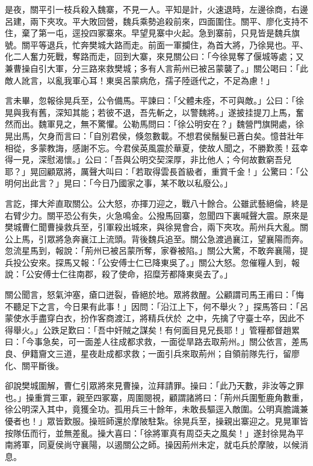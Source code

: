 是夜，關平引一枝兵殺入魏寨，不見一人。平知是計，火速退時，左邊徐商，右邊呂建，兩下夾攻。平大敗回營，魏兵乘勢追殺前來，四面圍住。關平、廖化支持不住，棄了第一屯，逕投四冢寨來。早望見寨中火起。急到寨前，只見皆是魏兵旗號。關平等退兵，忙奔樊城大路而走。前面一軍攔住，為首大將，乃徐晃也。平、化二人奮力死戰，奪路而走，回到大寨，來見關公曰：「今徐晃奪了偃城等處；又兼曹操自引大軍，分三路來救樊城；多有人言荊州已被呂蒙襲了。」關公喝曰：「此敵人訛言，以亂我軍心耳！東吳呂蒙病危，孺子陸遜代之，不足為慮！」

言未畢，忽報徐晃兵至，公令備馬。平諫曰：「父體未痊，不可與敵。」公曰：「徐晃與我有舊，深知其能；若彼不退，吾先斬之，以警魏將。」遂披挂提刀上馬，奮然而出。魏軍見之，無不驚懼。公勒馬問曰：「徐公明安在？」魏營門旗開處，徐晃出馬，欠身而言曰：「自別君侯，倏忽數載。不想君侯鬚髮已蒼白矣。憶昔壯年相從，多蒙教誨，感謝不忘。今君侯英風震於華夏，使故人聞之，不勝歎羨！茲幸得一見，深慰渴懷。」公曰：「吾與公明交契深厚，非比他人；今何故數窮吾兒耶？」晃回顧眾將，厲聲大叫曰：「若取得雲長首級者，重賞千金！」公驚曰：「公明何出此言？」晃曰：「今日乃國家之事，某不敢以私廢公。」

言訖，揮大斧直取關公。公大怒，亦揮刀迎之，戰八十餘合。公雖武藝絕倫，終是右臂少力。關平恐公有失，火急鳴金。公撥馬回寨，忽聞四下裏喊聲大震。原來是樊城曹仁聞曹操救兵至，引軍殺出城來，與徐晃會合，兩下夾攻。荊州兵大亂。關公上馬，引眾將急奔襄江上流頭。背後魏兵追至。關公急渡過襄江，望襄陽而奔。忽流星馬到，報說：「荊州已被呂蒙所奪，家眷被陷。」關公大驚，不敢奔襄陽，提兵投公安來。探馬又報：「公安傅士仁已降東吳了。」關公大怒。忽催糧人到，報說：「公安傅士仁往南郡，殺了使命，招糜芳都降東吳去了。」

關公聞言，怒氣沖塞，瘡口迸裂，昏絕於地。眾將救醒。公顧謂司馬王甫曰：「悔不聽足下之言，今日果有此事！」因問：「沿江上下，何不舉火？」探馬答曰：「呂蒙使水手盡穿白衣，扮作客商渡江，將精兵伏於𦩷𦪇之中，先擒了守臺士卒，因此不得舉火。」公跌足歎曰：「吾中奸賊之謀矣！有何面目見兄長耶！」管糧都督趙累曰：「今事急矣，可一面差人往成都求救，一面從旱路去取荊州。」關公依言，差馬良、伊籍齎文三道，星夜赴成都求救；一面引兵來取荊州；自領前隊先行，留廖化、關平斷後。

卻說樊城圍解，曹仁引眾將來見曹操，泣拜請罪。操曰：「此乃天數，非汝等之罪也。」操重賞三軍，親至四冢寨，周圍閱視，顧謂諸將曰：「荊州兵圍塹鹿角數重，徐公明深入其中，竟獲全功。孤用兵三十餘年，未敢長驅逕入敵圍。公明真膽識兼優者也！」眾皆歎服。操班師還於摩陂駐紮。徐晃兵至，操親出寨迎之。見晃軍皆按隊伍而行，並無差亂。操大喜曰：「徐將軍真有周亞夫之風矣！」遂封徐晃為平南將軍，同夏侯尚守襄陽，以遏關公之師。操因荊州未定，就屯兵於摩陂，以候消息。

